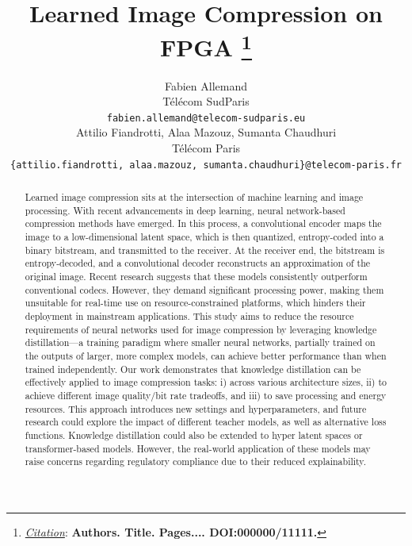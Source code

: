 \documentclass{article}
\title{Learned Image Compression on FPGA
\thanks{\textit{\underline{Citation}}: 
\textbf{Authors. Title. Pages.... DOI:000000/11111.}} 
}
\author{
	Fabien Allemand\\
	Télécom SudParis\\
	\texttt{fabien.allemand@telecom-sudparis.eu}\\
	\And
	Attilio Fiandrotti, Alaa Mazouz, Sumanta Chaudhuri\\
	Télécom Paris\\
	\texttt{\{attilio.fiandrotti, alaa.mazouz, sumanta.chaudhuri\}@telecom-paris.fr}\\
}
\begin{document}
\maketitle

\begin{abstract}
	Learned image compression sits at the intersection of machine learning and image processing. With recent advancements in deep learning, neural network-based compression methods have emerged. In this process, a convolutional encoder maps the image to a low-dimensional latent space, which is then quantized, entropy-coded into a binary bitstream, and transmitted to the receiver. At the receiver end, the bitstream is entropy-decoded, and a convolutional decoder reconstructs an approximation of the original image. Recent research suggests that these models consistently outperform conventional codecs. However, they demand significant processing power, making them unsuitable for real-time use on resource-constrained platforms, which hinders their deployment in mainstream applications. This study aims to reduce the resource requirements of neural networks used for image compression by leveraging knowledge distillation—a training paradigm where smaller neural networks, partially trained on the outputs of larger, more complex models, can achieve better performance than when trained independently. Our work demonstrates that knowledge distillation can be effectively applied to image compression tasks: i) across various architecture sizes, ii) to achieve different image quality/bit rate tradeoffs, and iii) to save processing and energy resources. This approach introduces new settings and hyperparameters, and future research could explore the impact of different teacher models, as well as alternative loss functions. Knowledge distillation could also be extended to hyper latent spaces or transformer-based models. However, the real-world application of these models may raise concerns regarding regulatory compliance due to their reduced explainability.
\end{abstract}



\end{document}
